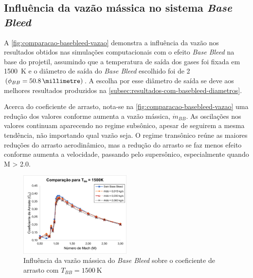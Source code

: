 \subsection{Influência da vazão mássica no sistema \textit{Base Bleed}} \label{subsec:resultados-com-basebleed-vazao}

A \autoref{fig:comparacao-basebleed-vazao} demonstra a influência da vazão nos resultados obtidos nas simulações computacionais com o efeito \textit{Base Bleed} na base do projetil, assumindo que a temperatura de saída dos gases foi fixada em \qty{1500}{\kelvin} e o diâmetro de saída do \textit{Base Bleed} escolhido foi de \qty{2}{\polegada} $\left(\phi_{BB} = \qty{50,8}{\millimetre}\right)$. A escolha por esse diâmetro de saída se deve aos melhores resultados produzidos na \autoref{subsec:resultados-com-basebleed-diametros}.

Acerca do coeficiente de arrasto, nota-se na \autoref{fig:comparacao-basebleed-vazao} uma redução dos valores conforme aumenta a vazão mássica, $\Dot{m}_{BB}$. As oscilações nos valores continuam aparecendo no regime subsônico, apesar de seguirem a mesma tendência, não importando qual vazão seja. O regime transônico reúne as maiores reduções do arrasto aerodinâmico, mas a redução do arrasto se faz menos efeito conforme aumenta a velocidade, passando pelo supersônico, especialmente quando M > \num{2,0}.

\begin{figure}[!ht]
	\centering
	\includegraphics[width=0.5\textwidth]{cd-combasebleed-1500K-2pol.png}
	\caption{Influência da vazão mássica do \textit{Base Bleed} sobre o coeficiente de arrasto com $T_{BB} = \qty{1500}{\kelvin}$}
	\label{fig:comparacao-basebleed-vazao}
\end{figure}

